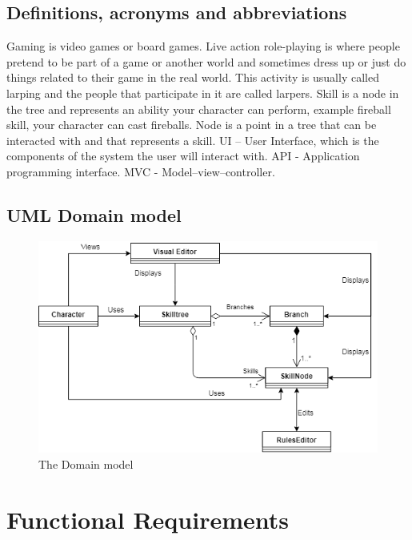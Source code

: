 \documentclass[12pt]{article}
\begin{document}
  \subsection{Definitions, acronyms and abbreviations}
  Gaming is video games or board games.\newline
  Live action role-playing is where people pretend to be part of a game or another world and sometimes dress up or just do things related to their game in the real world. This activity is usually called larping and the people that participate in it are called larpers.\newline
  Skill is a node in the tree and represents an ability your character can perform, example fireball skill, your character can cast fireballs.\newline
  Node is a point in a tree that can be interacted with and that represents a skill.\newline
  UI – User Interface, which is the components of the system the user will interact with.\newline
  API - Application programming interface.\newline
  MVC - Model–view–controller.\newline
  \subsection{UML Domain model}
  
\begin{figure}[H]
  \includegraphics[width=\linewidth]{images/TriiDomainModel.png}
  \caption{The Domain model}
  \label{fig:Domainmodel}
\end{figure}
  
\section{Functional Requirements}
\end{document}
